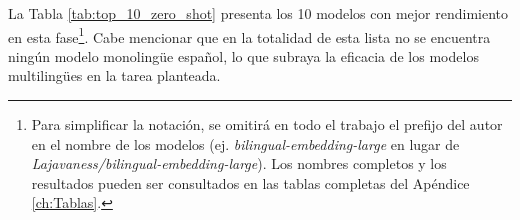 La Tabla \ref{tab:top_10_zero_shot} presenta los 10 modelos con mejor rendimiento en esta fase\footnote{Para simplificar la notación, se omitirá en todo el trabajo el prefijo del autor en el nombre de los modelos (ej. \textit{bilingual-embedding-large} en lugar de \textit{Lajavaness/bilingual-embedding-large}). Los nombres completos y los resultados pueden ser consultados en las tablas completas del Apéndice \ref{ch:Tablas}.}. Cabe mencionar que en la totalidad de esta lista no se encuentra ningún modelo monolingüe español, lo que subraya la eficacia de los modelos multilingües en la tarea planteada.

\begin{table}[!ht]
    \centering
    \caption{Top 10 modelos preentrenados en evaluación \textit{zero-shot} ordenados por \gls{MAP} (K = mil, M = millón, B = mil millones).}
    \label{tab:top_10_zero_shot}
\end{table}

